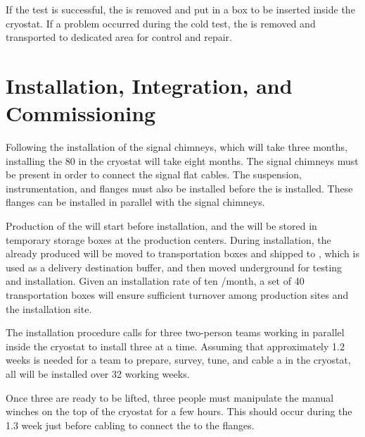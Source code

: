 If the test is successful, the  is removed and put in a box to be inserted inside the cryostat. If a problem occurred during the cold test, the  is removed and transported to dedicated area for control and repair. 
\section{Installation, Integration, and Commissioning}
\label{sec:dp-crp-install}
Following the installation of the signal chimneys, which will take three months, installing the \num{80}  in the cryostat will take eight  months. The signal chimneys must be present in order to 
connect the  signal flat cables. The suspension, instrumentation, and  flanges must also be  installed before the  is installed. These flanges can be installed in parallel with the signal chimneys. 

Production of the  will start before installation, and the  will be stored in temporary storage boxes at the production centers. During installation, the already produced  will be moved to transportation boxes and shipped to , which is used as a delivery destination buffer, and then  moved underground for testing and installation. Given an installation rate of ten /month, a set of \num{40} transportation boxes will ensure sufficient turnover among production sites and the installation site.

The installation procedure  calls for three two-person teams working in parallel inside the cryostat to install three  at a time. Assuming that %
approximately \num{1.2} weeks is needed for a team to prepare, survey, tune, and cable a  in the  cryostat, all \dptotcrp {} will be installed over \num{32} working weeks.

Once three  are ready to be lifted, three people must manipulate the manual winches on the top of the cryostat for a few hours. This should occur during the \num{1.3} week just before cabling to connect the  to the flanges. 


